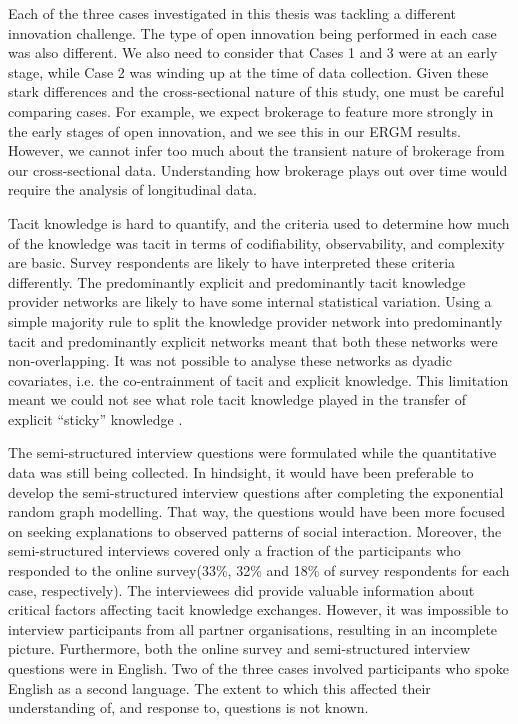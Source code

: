  Each of the three cases investigated in this thesis was tackling a different innovation challenge. The type of open innovation being performed in each case was also different. We also need to consider that Cases 1 and 3 were at an early stage, while Case 2 was winding up at the time of data collection. Given these stark differences and the cross-sectional nature of this study, one must be careful comparing cases. For example, we expect brokerage to feature more strongly in the early stages of open innovation, and we see this in our ERGM results. However, we cannot infer too much about the transient nature of brokerage from our cross-sectional data. Understanding how brokerage plays out over time would require the analysis of longitudinal data. \medskip

Tacit knowledge is hard to quantify, and the criteria used to determine how much of the knowledge was tacit in terms of codifiability, observability, and complexity are basic. Survey respondents are likely to have interpreted these criteria differently. The predominantly explicit and predominantly tacit knowledge provider networks are likely to have some internal statistical variation. Using a simple majority rule to split the knowledge provider network into predominantly tacit and predominantly explicit networks meant that both these networks were non-overlapping. It was not possible to analyse these networks as dyadic covariates, i.e. the co-entrainment of tacit and explicit knowledge. This limitation meant we could not see what role tacit knowledge played in the transfer of explicit \enquote{sticky} knowledge \citep{von1994sticky, szulanski2003sticky, seidler2008use}. \medskip

The semi-structured interview questions were formulated while the quantitative data was still being collected. In hindsight, it would have been preferable to develop the semi-structured interview questions after completing the exponential random graph modelling. That way, the questions would have been more focused on seeking explanations to observed patterns of social interaction. Moreover, the semi-structured interviews covered only a fraction of the participants who responded to the online survey(33\%, 32\% and 18\% of survey respondents for each case, respectively). The interviewees did provide valuable information about critical factors affecting tacit knowledge exchanges. However, it was impossible to interview participants from all partner organisations, resulting in an incomplete picture. Furthermore, both the online survey and semi-structured interview questions were in English. Two of the three cases involved participants who spoke English as a second language. The extent to which this affected their understanding of, and response to, questions is not known. \medskip

